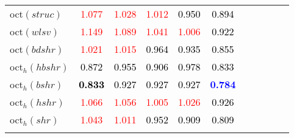 \begin{tabular}[t]{l|>{}cccc>{}c|ccccc}
oct$(struc)$ & \textcolor{red}{1.077} & \textcolor{red}{1.028} & \textcolor{red}{1.012} & \textcolor{black}{0.950} & \textcolor{black}{0.894} &  &  &  &  & \\
oct$(wlsv)$ & \textcolor{red}{1.149} & \textcolor{red}{1.089} & \textcolor{red}{1.041} & \textcolor{red}{1.006} & \textcolor{black}{0.922} &  &  &  &  & \\
oct$(bdshr)$ & \textcolor{red}{1.021} & \textcolor{red}{1.015} & \textcolor{black}{0.964} & \textcolor{black}{0.935} & \textcolor{black}{0.855} &  &  &  &  & \\
oct$_h(hbshr)$ & \textcolor{black}{0.872} & \textcolor{black}{0.955} & \textcolor{black}{0.906} & \textcolor{black}{0.978} & \textcolor{black}{0.833} &  &  &  &  & \\
oct$_h(bshr)$ & \textcolor{black}{\textbf{0.833}} & \textcolor{black}{0.927} & \textcolor{black}{0.927} & \textcolor{black}{0.927} & \textcolor{blue}{\textbf{0.784}} &  &  &  &  & \\
oct$_h(hshr)$ & \textcolor{red}{1.066} & \textcolor{red}{1.056} & \textcolor{red}{1.005} & \textcolor{red}{1.026} & \textcolor{black}{0.926} &  &  &  &  & \\
oct$_h(shr)$ & \textcolor{red}{1.043} & \textcolor{red}{1.011} & \textcolor{black}{0.952} & \textcolor{black}{0.909} & \textcolor{black}{0.809} &  &  &  &  & \\
\bottomrule
{}\\
\end{tabular}
